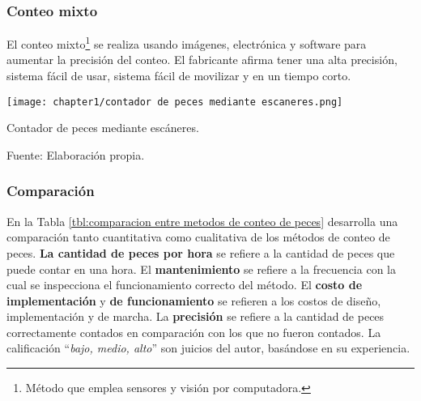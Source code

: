 \subsubsection{Conteo mixto}

El conteo mixto\footnote{Método que emplea sensores y visión por computadora.} se realiza usando imágenes, electrónica y software para aumentar la precisión del conteo. El fabricante afirma tener una alta precisión, sistema fácil de usar, sistema fácil de movilizar y en un tiempo corto. \citep{AquaScan2015}

\begin{myfigure}[H]
	\footnotesize\centering
	\texttt{[image: chapter1/contador de peces mediante escaneres.png]}
	\caption{Contador de peces mediante escáneres.}
	\begin{myflushcenter}
		Fuente: Elaboración propia.
	\end{myflushcenter}
	\label{fig:contador de peces mediante escaneres}
\end{myfigure}

\subsubsection{Comparación}

En la Tabla \ref{tbl:comparacion entre metodos de conteo de peces} desarrolla una comparación tanto cuantitativa como cualitativa de los métodos de conteo de peces. \textbf{La cantidad de peces por hora} se refiere a la cantidad de peces que puede contar en una hora. El \textbf{mantenimiento} se refiere a la frecuencia con la cual se inspecciona el funcionamiento correcto del método. El \textbf{costo de implementación} y \textbf{de funcionamiento} se refieren a los costos de diseño, implementación y de marcha. La \textbf{precisión} se refiere a la cantidad de peces correctamente contados en comparación con los que no fueron contados. La calificación “\textit{bajo, medio, alto}” son juicios del autor, basándose en su experiencia.


